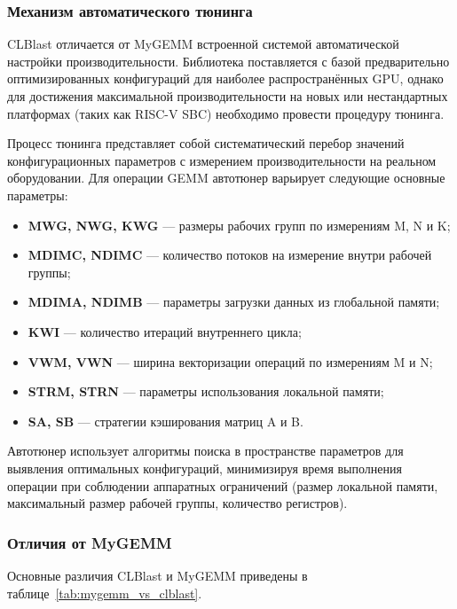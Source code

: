 \subsubsection{Механизм автоматического тюнинга}

CLBlast отличается от MyGEMM встроенной системой автоматической настройки производительности. Библиотека поставляется с базой предварительно оптимизированных конфигураций для наиболее распространённых GPU, однако для достижения максимальной производительности на новых или нестандартных платформах (таких как RISC-V SBC) необходимо провести процедуру тюнинга.

Процесс тюнинга представляет собой систематический перебор значений конфигурационных параметров с измерением производительности на реальном оборудовании. Для операции GEMM автотюнер варьирует следующие основные параметры:

\begin{itemize}
    \item \textbf{MWG, NWG, KWG} --- размеры рабочих групп по измерениям M, N и K;
    \item \textbf{MDIMC, NDIMC} --- количество потоков на измерение внутри рабочей группы;
    \item \textbf{MDIMA, NDIMB} --- параметры загрузки данных из глобальной памяти;
    \item \textbf{KWI} --- количество итераций внутреннего цикла;
    \item \textbf{VWM, VWN} --- ширина векторизации операций по измерениям M и N;
    \item \textbf{STRM, STRN} --- параметры использования локальной памяти;
    \item \textbf{SA, SB} --- стратегии кэширования матриц A и B.
\end{itemize}

Автотюнер использует алгоритмы поиска в пространстве параметров для выявления оптимальных конфигураций, минимизируя время выполнения операции при соблюдении аппаратных ограничений (размер локальной памяти, максимальный размер рабочей группы, количество регистров).

\subsubsection{Отличия от MyGEMM}

Основные различия CLBlast и MyGEMM приведены в таблице~\ref{tab:mygemm_vs_clblast}.

